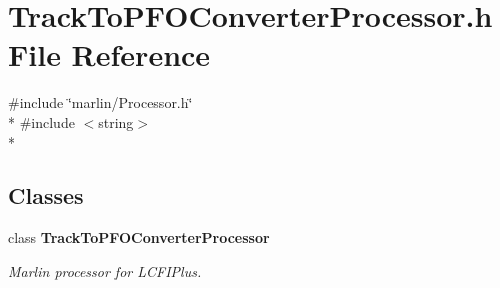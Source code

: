 \section{Track\-To\-P\-F\-O\-Converter\-Processor.\-h File Reference}
\label{TrackToPFOConverterProcessor_8h}
{\ttfamily \#include \char`\"{}marlin/\-Processor.\-h\char`\"{}}\\*
{\ttfamily \#include $<$string$>$}\\*
\subsection*{Classes}
\begin{DoxyCompactItemize}
\item 
class {\bf Track\-To\-P\-F\-O\-Converter\-Processor}
\begin{DoxyCompactList}\small\item\em Marlin processor for L\-C\-F\-I\-Plus. \end{DoxyCompactList}\end{DoxyCompactItemize}
